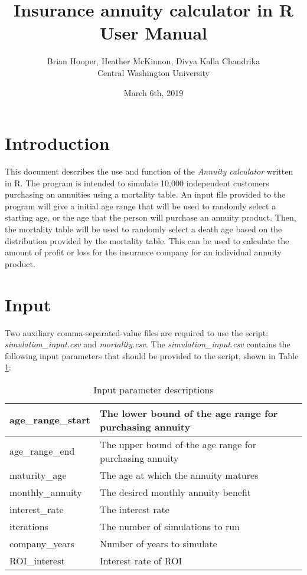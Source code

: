 \documentclass[12pt]{article}
\title{\textbf{Insurance annuity calculator in R} \\ User Manual}
\author{Brian Hooper, Heather McKinnon, Divya Kalla Chandrika  \\ Central Washington University}
\date{March 6th, 2019}
\begin{document}
	\maketitle
	
	\section{Introduction}
	This document describes the use and function of the \textit{Annuity calculator} written in R. The program is intended to simulate 10,000 independent customers purchasing an annuities using a mortality table. An input file provided to the program will give a initial age range that will be used to randomly select a starting age, or the age that the person will purchase an annuity product. Then, the mortality table will be used to randomly select a death age based on the distribution provided by the mortality table. This can be used to calculate the amount of profit or loss for the insurance company for an individual annuity product.
	
	\section{Input}
	Two auxiliary comma-separated-value files are required to use the script: \textit{simulation\_input.csv} and \textit{mortality.csv}. The \textit{simulation\_input.csv} contains the following input parameters that should be provided to the script, shown in Table \ref{tbl:description}: 
\begin{table}[H]
	\centering
	\begin{tabular}{|l|l|}
		\hline
		age\_range\_start & The lower bound of the age range for purchasing annuity \\ \hline
		age\_range\_end & The upper bound of the age range for purchasing annuity \\ \hline
		maturity\_age & The age at which the annuity matures \\ \hline
		monthly\_annuity & The desired monthly annuity benefit \\ \hline
		interest\_rate & The interest rate \\ \hline
		iterations & The number of simulations to run \\ \hline
		company\_years & Number of years to simulate \\ \hline
		ROI\_interest & Interest rate of ROI\\ \hline
	\end{tabular}
	\caption{Input parameter descriptions}
	\label{tbl:description}
\end{table}
\end{document}
